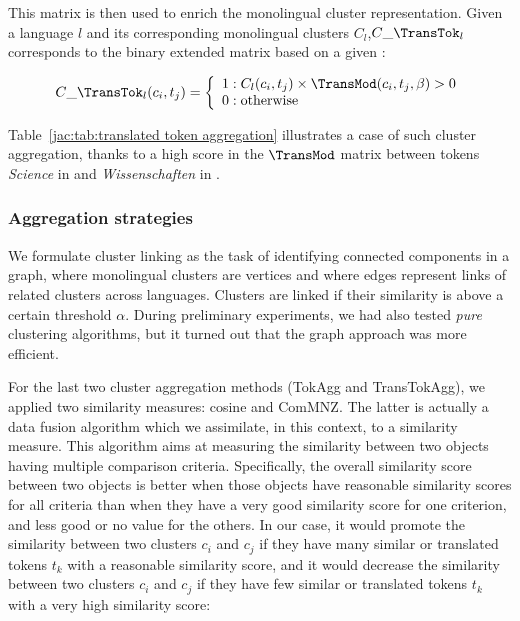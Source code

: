 \documentclass[output=paper]{langsci/langscibook}
\begin{document}
This matrix is then used to enrich the monolingual cluster
representation.  Given a language $l$ and its corresponding
monolingual clusters $C_{l}$,$C\_\TransTok_{l}$ corresponds to the
binary extended matrix based on a given :

\begin{equation}
C\_\TransTok_{l}(c_i,t_j) =
\left\{
  \begin{array}{lr}
    1 : C_{l}(c_i,t_j) \times \TransMod(c_i,t_j,\beta) > 0\\
    0 : \text{otherwise}
  \end{array}
\right.
\end{equation}

Table~\ref{jac:tab:translated token aggregation} illustrates a case of
such cluster aggregation, thanks to a high score in the $\TransMod$
matrix between tokens \textit{Science} in  and
\textit{Wissenschaften} in .

\subsubsection{Aggregation strategies}
\label{jac:aggregation clusters}

 
We formulate cluster linking as the task of identifying connected
components in a graph, where monolingual clusters are vertices and
where edges represent links of related clusters across
languages. Clusters are linked if their similarity is above a certain
threshold $\alpha$. During preliminary experiments, we had also tested
\emph{pure} clustering algorithms, but it turned out that the graph
approach was more efficient.

For the last two cluster aggregation methods (TokAgg and
TransTokAgg), we applied two similarity measures: cosine and
ComMNZ. The latter is actually a data fusion algorithm \citep{fox-94}
which we assimilate, in this context, to a similarity measure.  This
algorithm aims at measuring the similarity between two objects having
multiple comparison criteria. Specifically, the overall similarity
score between two objects is better when those objects have reasonable
similarity scores for all criteria than when they have a very good
similarity score for one criterion, and less good or no value for the
others.  In our case, it would promote the similarity between two
clusters $c_i$ and $c_j$ if they have many similar or translated
tokens $t_k$ with a reasonable similarity score, and it would decrease
the similarity between two clusters $c_i$ and $c_j$ if they have few
similar or translated tokens $t_k$ with a very high similarity score:
\end{document}

